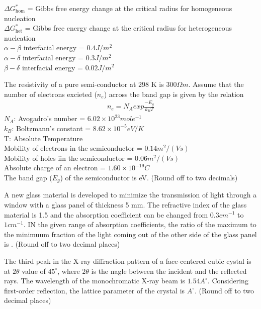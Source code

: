 $\Delta G^*_{\text{hom}}$ = Gibbs free energy change at the critical radius for homogeneous nucleation \\
$\Delta G^*_{\text{het}}$ = Gibbs free energy change at the critical radius for heterogeneous nucleation \\
$\alpha-\beta$ interfacial energy = $0.4 J/m^2$ \\
$\alpha-\delta$ interfacial energy = $0.3 J/m^2$ \\
$\beta-\delta$ interfacial energy = $0.02 J/m^2$ \\

\bigskip
\item The resistivity of a pure semi-conductor at 298 K is $300\Omega m$. Assume that the number of electrons excieted ($n_e$) across the band gap is given by the relation 
\begin{align*}
    n_{e}=N_{A} exp\frac{-E_{g}}{k_B T}
\end{align*}
$N_{A}$: Avogadro's number = $6.02\times 10^{23}mole^{-1}$\\
$k_B$: Boltzmann's constant = $8.62\times 10^{-5} eV/K$\\
T: Absolute Temperature \\
Mobility of electrons in the semiconductor = $0.14 m^2/(V s)$\\
Mobility of holes iin the semiconductor = $0.06 m^2/(V s)$\\
Absolute charge of an electron = $1.60\times10^{-19}C$\\
The band gap ($E_g$) of the semiconductor is \underline{\hspace{1cm}} eV. (Round off to two decimals)
\bigskip
\item A new glass material is developed to minimize the transmission of light through a window with a glass panel of thickness 5 mm. The refractive index of the glass material is 1.5 and the absorption coefficient can be changed from $0.3cm^{-1}$ to $1cm^{-1}$. IN the given range of absorption coefficients, the ratio of the maximum to the minimuum fraction of the light coming out of the other side of the glass panel is \underline{\hspace{1cm}}. (Round off to two decimal places)
\bigskip
\item The third peak in the X-ray diffraction pattern of a face-centered cubic cystal is at $2\theta$ value of $45^\circ$, where $2\theta$ is the nagle between the incident and the reflected rays. The wavelength of the monochromatic X-ray beam is $1.54 A^\circ$. Considering first-order reflection, the lattice parameter of the crystal is \underline{\hspace{1cm}}$A^\circ$. (Round off to two decimal places)
